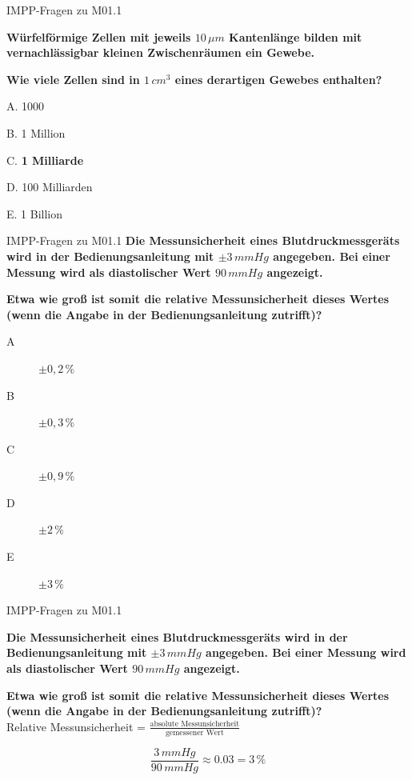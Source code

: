 \documentclass{beamer}
\begin{document}
\begin{frame}{IMPP-Fragen zu M01.1}

\textbf{Würfelförmige Zellen mit jeweils \(10\,\mu m\) Kantenlänge  bilden mit vernachlässigbar kleinen Zwischenräumen ein Gewebe.}

\textbf{Wie viele Zellen sind in \(1\,cm^3 \) eines derartigen Gewebes enthalten?} \\[0.2 cm]

\begin{description}
\item{A.}
1000
\item{B.}
1 Million
\item{C.} 
\textcolor{theme}{\textbf{1 Milliarde}}
\item{D.}
100 Milliarden
\item{E.}
1 Billion
\end{description}

    
\end{frame}



\begin{frame}{IMPP-Fragen zu M01.1}
\textbf{Die Messunsicherheit eines Blutdruckmessgeräts wird in der Bedienungsanleitung mit \(\pm 3\, mmHg\) angegeben. Bei einer Messung wird als diastolischer Wert \(90\,mmHg\) angezeigt.}

\textbf{Etwa wie groß ist somit die relative Messunsicherheit dieses Wertes (wenn die Angabe in der Bedienungsanleitung zutrifft)?}\\[0.2 cm]


\begin{description}
\item[A]
\(\pm 0,2\,\%\) 
\item[B]
\(\pm 0,3\,\%\) 
\item[C] 
\(\pm 0,9\,\% \) 
\item[D]
\(\pm 2\,\%\) 
\item[E]
\(\pm 3\,\%\) 
\end{description}
    
\end{frame}


\begin{frame}{IMPP-Fragen zu M01.1}

\textbf{Die Messunsicherheit eines Blutdruckmessgeräts wird in der Bedienungsanleitung mit \(\pm 3\, mmHg\) angegeben. Bei einer Messung wird als diastolischer Wert \(90\,mmHg\) angezeigt.}

\textbf{Etwa wie groß ist somit die relative Messunsicherheit dieses Wertes (wenn die Angabe in der Bedienungsanleitung zutrifft)?}\\[0.2 cm]


Relative Messunsicherheit = \(\frac{\text{absolute Messunsicherheit}}{\text{gemessener Wert}}\)

\[
\frac{3\,mmHg}{90\,mmHg} \approx 0.03 = 3\,\%
\]


\end{frame}
\end{document}
